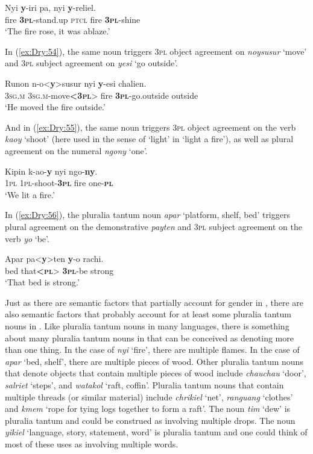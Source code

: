 \documentclass[output=collectionpaper]{langsci/langscibook}
\begin{document}
\ea \label{ex:Dry:53}
\gll Nyi	\textbf{y}-iri	pa,	nyi	\textbf{y}-reliel.\\
fire \textbf{\textsc{3pl}}-stand.up \textsc{ptcl} fire \textbf{\textsc{3pl}}-shine\\
\glt `The fire rose, it was ablaze.'
\z

In (\ref{ex:Dry:54}), the same noun triggers \textsc{3pl} object agreement on \textit{noysusur} `move' and \textsc{3pl} subject agreement on \textit{yesi} `go outside'.

\ea \label{ex:Dry:54}
\gll Runon	n-o<\textbf{y}>susur	nyi	\textbf{y}-esi	chalien.\\
\textsc{3sg.m} \textsc{3sg.m}-move\textbf{<\textsc{3pl}}> fire \textbf{\textsc{3pl}}-go.outside outside\\
\glt `He moved the fire outside.'
\z

And in (\ref{ex:Dry:55}), the same noun triggers \textsc{3pl} object agreement on the verb \textit{kaoy} `shoot' (here used in the sense of `light' in `light a fire'), as well as plural agreement on the numeral \textit{ngony} `one'.

\ea \label{ex:Dry:55}
\gll Kipin	k-ao-\textbf{y}	nyi	ngo-\textbf{ny}.\\
\textsc{1pl} \textsc{1pl}-shoot-\textbf{\textsc{3pl}} fire one-\textbf{\textsc{pl}}\\
\glt `We lit a fire.'
\z

In (\ref{ex:Dry:56}), the pluralia tantum noun \textit{apar} `platform, shelf, bed' triggers plural agreement on the demonstrative \textit{payten} and \textsc{3pl} subject agreement on the verb \textit{yo} `be'.

\ea  \label{ex:Dry:56}
\gll Apar	pa<\textbf{y}>ten	\textbf{y}-o	rachi.\\
bed that\textbf{<\textsc{pl}}> \textbf{\textsc{3pl}}-be strong\\
\glt `That bed is strong.'
\z

Just as there are semantic factors that partially account for gender in , there are also semantic factors that probably account for at least some pluralia tantum nouns in . Like pluralia tantum nouns in many languages, there is something about many pluralia tantum nouns in  that can be conceived as denoting more than one thing. In the case of \textit{nyi} `fire', there are multiple flames. In the case of \textit{apar} `bed, shelf', there are multiple pieces of wood. Other pluralia tantum nouns that denote objects that contain multiple pieces of wood include \textit{chauchau} `door', \textit{salriet} `steps', and \textit{watakol} `raft, coffin'. Pluralia tantum nouns that contain multiple threads (or similar material) include \textit{chrikiel} `net', \textit{ranguang} `clothes' and \textit{kmem} `rope for tying logs together to form a raft'. The noun \textit{tim} `dew' is pluralia tantum and could be construed as involving multiple drops. The noun \textit{yikiel} `language, story, statement, word' is pluralia tantum and one could think of most of these uses as involving multiple words.
\end{document}
